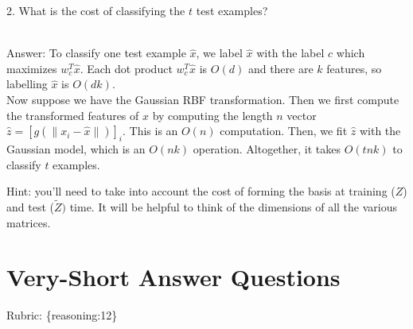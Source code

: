 \documentclass{article}
\def\rubric#1{\gre{Rubric: \{#1\}}}{}
\def\blu#1{{\color{blu}#1}}
\def\gre#1{{\color{gre}#1}}
\def\ans#1{\gre{Answer: #1}}{}
\def\enum#1{\begin{enumerate}#1\end{enumerate}}
\begin{document}
\enum{\blu{
		\item[2.] What is the cost of classifying the $t$ test examples?
	}
	\\\ans{To classify one test example $\hat x$, we label $\hat x$ with the label $c$ which maximizes $w_c^T\hat x$. Each dot product $w_c^T\hat x$ is $O(d)$ and there are $k$ features, so labelling $\hat x$ is $O(dk)$.
		\medskip\\ Now suppose we have the Gaussian RBF transformation. Then we first compute the transformed features of $\hat x$ by computing the length $n$ vector $\hat z = [g(\|x_i - \hat x\|)]_i$. This is an $O(n)$ computation. Then, we fit $\hat z$ with the Gaussian model, which is an $O(nk)$ operation. Altogether, it takes $O(tnk)$ to classify $t$ examples.
}}
Hint: you'll need to take into account the cost of forming the basis at training ($Z$) and test ($\tilde{Z})$ time. It will be helpful to think of the dimensions of all the various matrices.



\section{Very-Short Answer Questions}
\rubric{reasoning:12}
\end{document}
